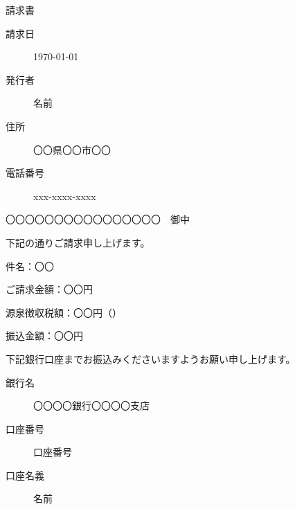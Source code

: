 \documentclass{jlreq}
\newcommand{\請求書}{\begin{center}{\Huge 請求書}\end{center}}
\newcommand{\請求日}[1]{
    \begin{flushright}
        \begin{description}
            \item[請求日] #1
        \end{description}
    \end{flushright}
    }
\newcommand{\御中}[1]{#1　御中}
\newcommand{\発行者}[3]{
    \begin{flushright}
        \begin{description}
            \item[発行者] #1
            \item[住所] #2
            \item[電話番号] #3
        \end{description}
    \end{flushright}
}
\newcommand{\振込先}[3]{
    \begin{description}
        \item[銀行名] #1
        \item[口座番号] #2
        \item[口座名義] #3
    \end{description}
}
\begin{document}
\noindent

\請求書

\請求日{\today}
\発行者{名前}{〇〇県〇〇市〇〇}{xxx-xxxx-xxxx}

\御中{〇〇〇〇〇〇〇〇〇〇〇〇〇〇〇〇}

\hrulefill

下記の通りご請求申し上げます。

件名：〇〇

ご請求金額：〇〇円

源泉徴収税額：〇〇円（）

振込金額：〇〇円

\hrulefill

下記銀行口座までお振込みくださいますようお願い申し上げます。

\振込先{〇〇〇〇銀行〇〇〇〇支店}{口座番号}{名前}
\end{document}
